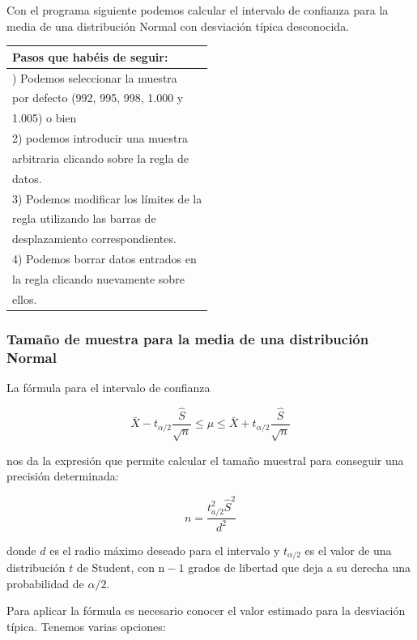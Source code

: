 \documentclass[
]{article}
\begin{document}
Con el programa siguiente podemos calcular el intervalo de confianza para la media de una distribución Normal con desviación típica desconocida.

\begin{longtable}[]{@{}l@{}}
\toprule\noalign{}
Pasos que habéis de seguir: \\
\midrule\noalign{}
\endhead
\bottomrule\noalign{}
\endlastfoot
1) Podemos seleccionar la muestra \\
por defecto (992, 995, 998, 1.000 y \\
1.005) o bien \\
2) podemos introducir una muestra \\
arbitraria clicando sobre la regla de \\
datos. \\
3) Podemos modificar los límites de la \\
regla utilizando las barras de \\
desplazamiento correspondientes. \\
4) Podemos borrar datos entrados en \\
la regla clicando nuevamente sobre \\
ellos. \\
\end{longtable}

\subsubsection{Tamaño de muestra para la media de una distribución Normal}\label{tamauxf1o-de-muestra-para-la-media-de-una-distribuciuxf3n-normal}

La fórmula para el intervalo de confianza

\[
\bar{X}-t_{\alpha / 2} \frac{\hat{S}}{\sqrt{n}} \leq \mu \leq \bar{X}+t_{\alpha / 2} \frac{\hat{S}}{\sqrt{n}}
\]

nos da la expresión que permite calcular el tamaño muestral para conseguir una precisión determinada:

\[
n=\frac{t_{a / 2}^{2} \hat{S}^{2}}{d^{2}}
\]

donde \(d\) es el radio máximo deseado para el intervalo y \(t_{\alpha / 2}\) es el valor de una distribución \(t\) de Student, con \(\mathrm{n}-1\) grados de libertad que deja a su derecha una probabilidad de \(\alpha / 2\).

Para aplicar la fórmula es necesario conocer el valor estimado para la desviación típica. Tenemos varias opciones:
\end{document}

